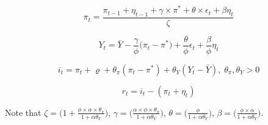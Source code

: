 \documentclass[12pt]{article}
\makeatletter
\newcommand\Taccount[3][3cm]%
{{\renewcommand\arraystretch{1.3}%
		\begin{adjustbox}{width=0.4\textwidth}
		\begin{tabular}[t]{@{}p{#1}|p{#1}@{}}
			\multicolumn{2}{@{}c@{}}{#2}\\
			\hline
			\hline
			#3
		\end{tabular}%
		\end{adjustbox}
	
}}
\newcommand{\1}{\mathbbm 1}
\renewcommand{\rho}{\varrho}
\makeatother
\begin{document}
\begin{equation}
	\pi_{t}  = \frac{\pi_{t-1} + \eta_{t-1} + \gamma \times \pi^{*} + \theta \times \epsilon_{t} +  \beta \eta_{t}}{\zeta}
\end{equation}

\begin{equation}
	Y_{t}  = \bar{Y} - \frac{\gamma}{\phi} \bigg(\pi_{t} - \pi^{*}\bigg) + \frac{\theta}{\phi} \epsilon_{t} + \frac{\beta}{\phi} \eta_{t}
\end{equation}


	

\begin{equation}
	i_{t} = \pi_{t} + \rho + \theta_{\pi} (\pi_{t} - \pi^{*}) + \theta_{Y} (Y_{t} - \bar{Y}), \; \theta_{\pi}, \theta_{Y} > 0
\end{equation}

\begin{equation}
	r_{t} = i_{t} - (\pi_{t} + \eta_{t})
\end{equation}

Note that $\zeta = \bigg(1 +  \frac{\phi \times \alpha \times \theta_{\pi}}{1 + \alpha \theta_{Y}}\bigg)$, $\gamma = \bigg(\frac{\alpha \times \phi \times \theta_{\pi}}{1 + \alpha \theta_{Y}}\bigg)$, $\theta = \bigg(\frac{\phi}{1 + \alpha \theta_{Y}}\bigg)$, $\beta = \bigg(\frac{\phi \times \alpha}{1 + \alpha \theta_{Y}}\bigg)$.














	
		
		
	
		
\end{document}
